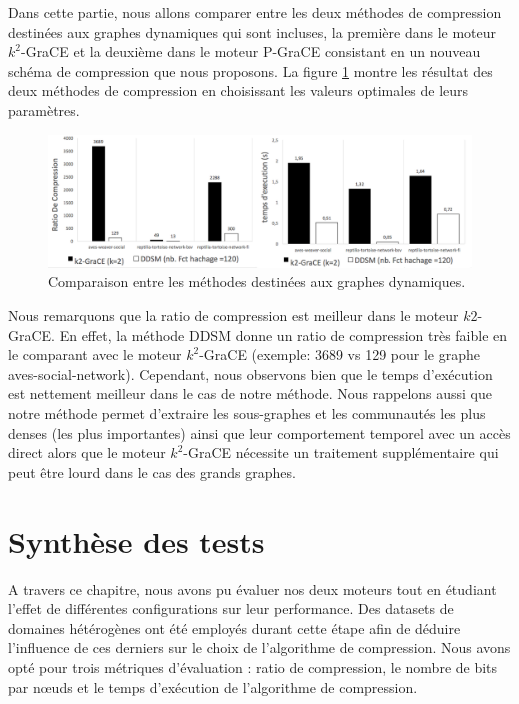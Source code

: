 	Dans cette partie, nous allons comparer entre les deux méthodes de compression destinées aux graphes dynamiques qui sont incluses, la première dans le moteur $k^2$-GraCE et la deuxième dans le moteur P-GraCE consistant en un nouveau schéma de compression que nous proposons. La figure \ref{fig:comp-dyn} montre les résultat des deux méthodes de compression en choisissant les valeurs optimales de leurs paramètres.
	
	\begin{figure}[H]
		\begin{center}
		 \includegraphics[scale=0.4]{ressources/image/dynComp.png}
			
			
			\caption{Comparaison entre les méthodes destinées aux graphes dynamiques.}
			\label{fig:comp-dyn}
		\end{center}
	\end{figure}
	
	
	Nous remarquons que la ratio de compression est meilleur dans le moteur $k2$-GraCE. En effet, la méthode DDSM donne un ratio de compression très faible en le comparant avec le moteur $k^2$-GraCE (exemple: 3689 vs 129 pour le graphe aves-social-network). Cependant, nous observons bien que le temps d'exécution est nettement meilleur dans le cas de notre méthode. Nous rappelons aussi que notre méthode permet d'extraire les sous-graphes et les communautés les plus denses (les plus importantes) ainsi que leur comportement temporel avec un accès direct alors que le moteur $k^2$-GraCE nécessite un traitement supplémentaire qui peut être lourd dans le cas des grands graphes. 
	
	 
	
	\section{Synthèse des tests}
	
	A travers ce chapitre,  nous avons pu évaluer nos deux moteurs tout en étudiant l'effet de différentes configurations sur leur performance. Des datasets de domaines hétérogènes ont été employés durant cette étape afin de déduire l'influence de ces derniers sur le choix de l'algorithme de compression. Nous avons opté pour trois métriques d'évaluation : ratio de compression, le nombre de bits par nœuds et le temps d'exécution de l'algorithme de compression.
	
